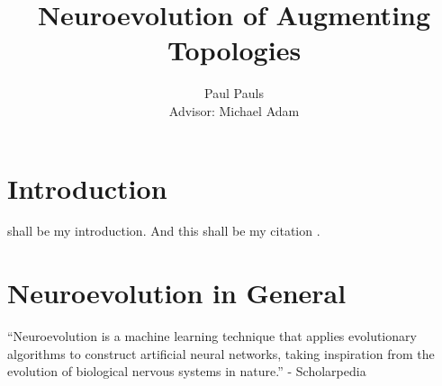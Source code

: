 \documentclass[journal, a4paper]{IEEEtran}
\begin{document}
  \title{Neuroevolution of Augmenting Topologies}
  \author{Paul Pauls\\
          Advisor: Michael Adam}
  \maketitle

\begin{abstract}
\blindtext
\end{abstract}


\section{Introduction}

 shall be my introduction. And this shall be my citation \cite{cite01}.




\section{Neuroevolution in General}

“Neuroevolution is a machine learning technique that applies evolutionary algorithms to construct artificial neural networks, taking inspiration from the evolution of biological nervous systems in nature.” - Scholarpedia
\end{document}
